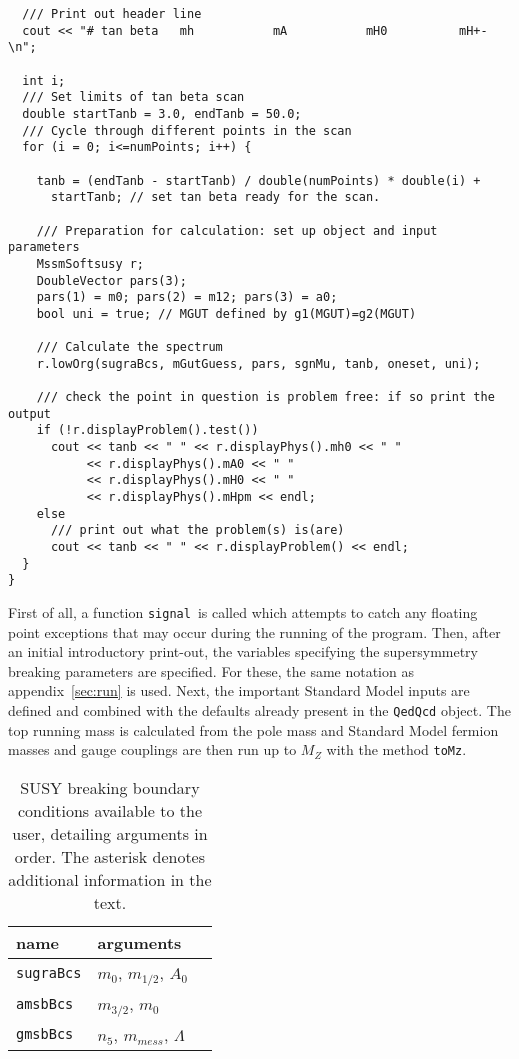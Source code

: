 \documentclass[]{article}
\def\code#1{\small{\tt #1}\normalsize}
\begin{document}
\begin{verbatim}
  /// Print out header line
  cout << "# tan beta   mh           mA           mH0          mH+-\n";

  int i; 
  /// Set limits of tan beta scan
  double startTanb = 3.0, endTanb = 50.0;
  /// Cycle through different points in the scan
  for (i = 0; i<=numPoints; i++) {

    tanb = (endTanb - startTanb) / double(numPoints) * double(i) +
      startTanb; // set tan beta ready for the scan.

    /// Preparation for calculation: set up object and input parameters
    MssmSoftsusy r; 
    DoubleVector pars(3); 
    pars(1) = m0; pars(2) = m12; pars(3) = a0;
    bool uni = true; // MGUT defined by g1(MGUT)=g2(MGUT)
    
    /// Calculate the spectrum
    r.lowOrg(sugraBcs, mGutGuess, pars, sgnMu, tanb, oneset, uni);

    /// check the point in question is problem free: if so print the output
    if (!r.displayProblem().test()) 
      cout << tanb << " " << r.displayPhys().mh0 << " " 
           << r.displayPhys().mA0 << " " 
           << r.displayPhys().mH0 << " " 
           << r.displayPhys().mHpm << endl;
    else
      /// print out what the problem(s) is(are)
      cout << tanb << " " << r.displayProblem() << endl;
  }
}
\end{verbatim}
\normalsize
First of all, a function \code{signal}~is called which attempts to catch any floating point
exceptions that may occur during the running of the program. 
Then, after an initial introductory print-out, the variables specifying the
supersymmetry breaking parameters are specified. For these, the same notation
as appendix~\ref{sec:run} is used. Next, the important Standard Model inputs
are defined and combined with the defaults already present in the
\code{QedQcd} object. The top running mass is calculated from the pole mass
and 
Standard Model fermion masses and gauge couplings are
then run up to $M_Z$ with the method \code{toMz}.

\begin{table}\begin{center}
\begin{tabular}[l]{lll} name & arguments \\ 
\hline
\code{sugraBcs} & $m_0$, $m_{1/2}$, $A_0$ \\
\code{amsbBcs} & $m_{3/2}$, $m_0$ \\
\code{gmsbBcs} & $n_5$, $m_{mess}$, $\Lambda$ \\
\end{tabular}\caption{\label{bcs} SUSY breaking boundary conditions available to the user, detailing arguments
in order. The asterisk denotes additional information in the text.}\end{center}\end{table}
\end{document}
